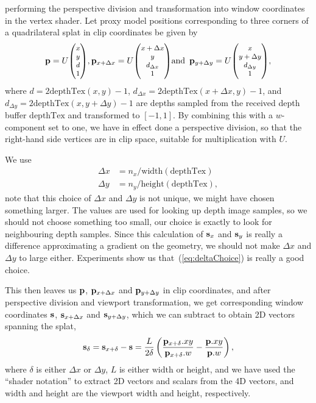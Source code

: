 performing the perspective division and transformation into window coordinates
in the vertex shader. Let proxy model positions corresponding to three corners
of a quadrilateral splat in clip coordinates be
given by
\[
  \pv =
  U { \small \begin{pmatrix} x \\ y \\ d \\ 1 \end{pmatrix} },
  \pv_{x+\Delta x} =
  U { \small \begin{pmatrix} x+\Delta x \\ y \\ d_{\Delta x} \\ 1 \end{pmatrix} }
  \text{and}\, \, \, 
  \pv_{y+\Delta y} =
  U { \small \begin{pmatrix} x \\ y+\Delta y \\ d_{\Delta y} \\ 1 \end{pmatrix} },
\]
where $d = 2\text{depthTex}(x, y) - 1$, $d_{\Delta x} =
2\text{depthTex}(x+\Delta x, y) - 1$, and $d_{\Delta y} = 2\text{depthTex}(x,
y+\Delta y) - 1$ are depths sampled from the received depth buffer
$\text{depthTex}$ and transformed to $[-1, 1]$. By combining this with a
$w$-component set to one, we have in effect done a perspective division, so that
the right-hand side vertices are in clip space, suitable for multiplication with
$U$.

We use
\begin{equation}
  \begin{aligned}
    \Delta x & = n_x / \text{width}(\text{depthTex}) \\
    \Delta y & = n_y / \text{height}(\text{depthTex}),
  \end{aligned}
  \label{eq:deltaChoice}
\end{equation}
note that this choice of $\Delta x$ and $\Delta y$ is not unique, we might have
chosen something larger. The values are used for looking up depth image samples,
so we should not choose something too small, our choice is exactly to look for
neighbouring depth samples. Since this calculation of $\mathbf{s}_x$ and $\mathbf{s}_y$ is
really a difference approximating a gradient on the geometry, we should not make
$\Delta x$ and $\Delta y$ to large either. Experiments show us
that~(\ref{eq:deltaChoice}) is really a good choice.

This then leaves us $\mathbf{p}$, $\mathbf{p}_{x+\Delta x}$ and $\mathbf{p}_{y+\Delta y}$ in clip
coordinates, and after perspective division and viewport transformation, we get
corresponding window coordinates $\mathbf{s}$, $\mathbf{s}_{x+\Delta x}$ and $\mathbf{s}_{y+\Delta
y}$, which we can subtract to obtain 2D vectors spanning the splat,
\[
  \mathbf{s}_{\delta} =
  \mathbf{s}_{x+\delta} - \mathbf{s} =
    \frac{L}{2\delta} \left(
        \frac{\mathbf{p}_{x+\delta}.xy}{\mathbf{p}_{x+\delta}.w} -
        \frac{\mathbf{p}.xy}{\mathbf{p}.w}
    \right),
\]
where $\delta$ is either $\Delta x$ or $\Delta y$, $L$ is either
$\text{width}$ or $\text{height}$, and we have used the ``shader
notation'' to extract 2D vectors and scalars from the 4D vectors, and
$\text{width}$ and $\text{height}$ are the viewport width and height,
respectively.


